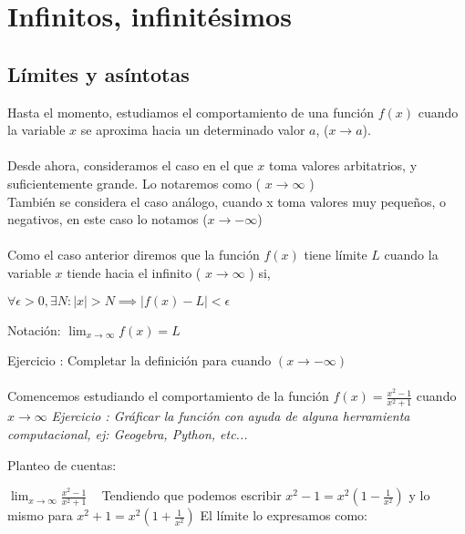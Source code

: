 \documentclass[11pt, a4paper]{article}
\begin{document}
{\newpage
\section{Infinitos, infinit\'esimos}

\subsection{ L\'imites y as\'intotas }

Hasta el momento, estudiamos el comportamiento de una funci\'on {\color{blue} $f(x)$} cuando la variable {\color{blue}$x$} se aproxima hacia un determinado valor {\color{blue} $a$}, ($ x \to a $).\\ \\ 
Desde ahora, consideramos el caso en el que $x$ toma valores arbitatrios, y suficientemente grande. Lo notaremos como {\color{blue}( $ x \to \infty $ )}\\
Tambi\'en se considera el caso an\'alogo, cuando x toma valores muy peque\~nos, o negativos, en este caso lo notamos {\color{blue}($x \to - \infty$)} \\ \\ 
Como el caso anterior diremos que la funci\'on $f(x)$ tiene l\'imite $L$ cuando la variable $x$ tiende hacia el infinito {\color{blue}( $ x \to \infty $ )} si, \\
\begin{center}
    {\color{blue} $\forall \epsilon > 0, \exists N : |x| > N \implies | f(x) - L | < \epsilon $ } \\ \hfill
    
    Notaci\'on: {\color{blue} $ \displaystyle \lim_{ x \to \infty } f(x) = L   $}
\end{center}

{\color{magenta} Ejercicio : Completar la definici\'on para cuando $( x \to - \infty )$ }\\ \\
Comencemos estudiando el comportamiento de la funci\'on $ \displaystyle f(x) = \frac{x^2-1}{x^2+1} $ cuando $x \to \infty $ \textit{{\color{magenta} Ejercicio : Gr\'aficar la funci\'on con ayuda de alguna herramienta computacional, ej: Geogebra, Python, etc... }} \\
\begin{center}
    Planteo de cuentas: \\ \hfill
    
    $\displaystyle \lim_{x \to \infty} \frac{x^2-1}{x^2+1}  $ ~ Tendiendo que podemos escribir {\color{blue} $\displaystyle x^2 - 1 = x^2(1-\frac{1}{x^2})$} y lo mismo para $\displaystyle x^2 + 1 = x^2( 1 + \frac{1}{x^2} )$ El l\'imite lo expresamos como: \\ \hfill


\end{center}}
\end{document}
